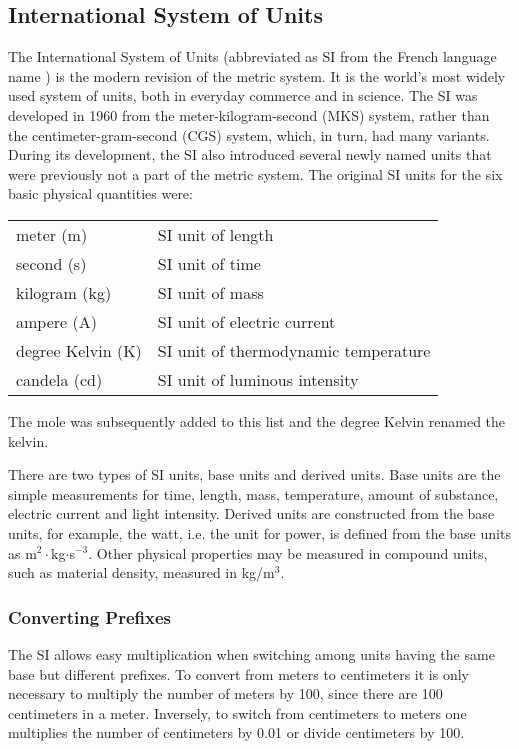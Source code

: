 \subsection*{International System of Units}
The International System of Units (abbreviated as SI from the French language name
) is the modern revision of the metric system. It is the world's
most widely used system of units, both in everyday commerce and in science. The SI was
developed in 1960 from the meter-kilogram-second (MKS) system, rather than the
centimeter-gram-second (CGS) system, which, in turn, had many variants. During its
development, the SI also introduced several newly named units that were previously not a
part of the metric system. The original SI units for the six basic physical quantities were:
\begin{center}
\begin{tabular}{ll}
meter (m) &SI unit of length\\
second (s) &SI unit of time\\
kilogram (kg) &SI unit of mass\\
ampere (A) &SI unit of electric current\\
degree Kelvin (K) &SI unit of thermodynamic temperature\\
candela (cd) & SI unit of luminous intensity\\
\end{tabular}
\end{center}
The mole was subsequently added to this list and the degree Kelvin renamed the kelvin.

There are two types of SI units, base units and derived units. Base units are the
simple measurements for time, length, mass, temperature, amount of substance, electric
current and light intensity. Derived units are constructed from the base units, for example,
the watt, i.e. the unit for power, is defined from the base units as m$^2\cdot$kg$\cdot$s$^{-3}$. Other physical
properties may be measured in compound units, such as material density, measured in
kg/m$^3$.

\subsubsection*{Converting Prefixes}
The SI allows easy multiplication when switching among units having the same base
but different prefixes. To convert from meters to centimeters it is only necessary to multiply
the number of meters by 100, since there are 100 centimeters in a meter. Inversely, to
switch from centimeters to meters one multiplies the number of centimeters by 0.01 or
divide centimeters by 100.

